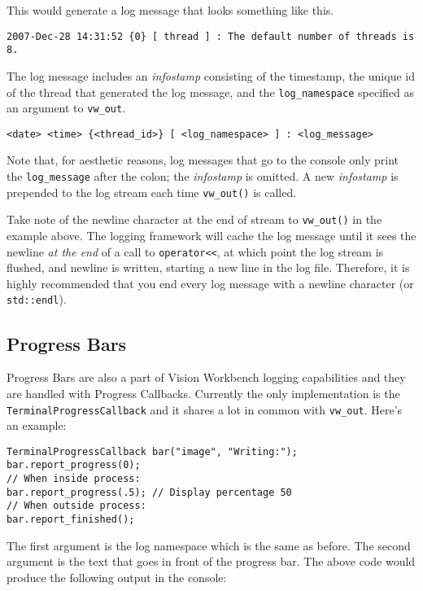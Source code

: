 This would generate a log message that looks something like this.

\begin{verbatim}
2007-Dec-28 14:31:52 {0} [ thread ] : The default number of threads is 8.
\end{verbatim}

The log message includes an {\em infostamp} consisting of the timestamp,
the unique id of the thread that generated the log message, and the
\verb#log_namespace# specified as an argument to \verb#vw_out#.

\begin{verbatim}
<date> <time> {<thread_id>} [ <log_namespace> ] : <log_message>
\end{verbatim}

Note that, for aesthetic reasons, log messages that go to the console
only print the \verb#log_message# after the colon; the {\em infostamp} is
omitted. A new {\em infostamp} is prepended to the log stream each
time \verb#vw_out()# is called.

Take note of the newline character at the end of stream to
\verb#vw_out()# in the example above.  The logging framework will
cache the log message until it sees the newline {\em at the end} of a
call to \verb#operator<<#, at which point the log stream is flushed,
and newline is written, starting a new line in the log file.
Therefore, it is highly recommended that you end every log message
with a newline character (or \verb#std::endl#).

\subsection{Progress Bars}

Progress Bars are also a part of Vision Workbench logging capabilities
and they are handled with Progress Callbacks. Currently the only
implementation is the \verb#TerminalProgressCallback# and it shares a
lot in common with \verb#vw_out#. Here's an example:

\begin{verbatim}
TerminalProgressCallback bar("image", "Writing:");
bar.report_progress(0);
// When inside process:
bar.report_progress(.5); // Display percentage 50
// When outside process:
bar.report_finished();
\end{verbatim}

The first argument is the log namespace which is the same as
before. The second argument is the text that goes in front of the
progress bar. The above code would produce the following output in the
console:

